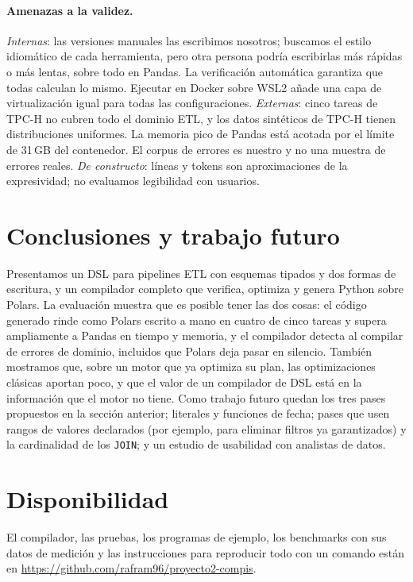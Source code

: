 \documentclass[sigplan,screen,nonacm]{acmart}
\begin{document}
\paragraph{Amenazas a la validez.}
\emph{Internas}: las versiones manuales las escribimos nosotros; buscamos el estilo
idiomático de cada herramienta, pero otra persona podría escribirlas más rápidas o más
lentas, sobre todo en Pandas. La verificación automática garantiza que todas calculan lo
mismo. Ejecutar en Docker sobre WSL2 añade una capa de virtualización igual para todas las
configuraciones. \emph{Externas}: cinco tareas de TPC-H no cubren todo el dominio ETL, y los
datos sintéticos de TPC-H tienen distribuciones uniformes. La memoria pico de Pandas está
acotada por el límite de 31\,GB del contenedor. El corpus de errores es nuestro y no una
muestra de errores reales. \emph{De constructo}: líneas y tokens son aproximaciones de la
expresividad; no evaluamos legibilidad con usuarios.

\section{Conclusiones y trabajo futuro}

Presentamos un DSL para pipelines ETL con esquemas tipados y dos formas de escritura, y un
compilador completo que verifica, optimiza y genera Python sobre Polars. La evaluación muestra
que es posible tener las dos cosas: el código generado rinde como Polars escrito a mano en
cuatro de cinco tareas y supera ampliamente a Pandas en tiempo y memoria, y el compilador
detecta al compilar \erroresCompilacion{} de \erroresTotal{} errores de dominio, incluidos
\erroresSilenciososDetectados{} que Polars deja pasar en silencio. También mostramos que, sobre
un motor que ya optimiza su plan, las optimizaciones clásicas aportan poco, y que el valor
de un compilador de DSL está en la información que el motor no tiene. Como trabajo futuro
quedan los tres pases propuestos en la sección anterior; literales y funciones de fecha;
pases que usen rangos de valores declarados (por ejemplo, para eliminar filtros ya garantizados)
y la cardinalidad de los \texttt{JOIN}; y un estudio de usabilidad con analistas de datos.

\section*{Disponibilidad}
El compilador, las pruebas, los programas de ejemplo, los benchmarks con sus datos de
medición y las instrucciones para reproducir todo con un comando están en
\url{https://github.com/rafram96/proyecto2-compis}.
\end{document}
